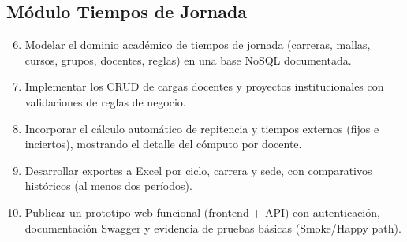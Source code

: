 \subsection*{Módulo Tiempos de Jornada}
\begin{enumerate}\setcounter{enumi}{5}
  \item Modelar el dominio académico de tiempos de jornada (carreras, mallas, cursos, grupos, docentes, reglas) en una base NoSQL documentada.
  \item Implementar los CRUD de cargas docentes y proyectos institucionales con validaciones de reglas de negocio.
  \item Incorporar el cálculo automático de repitencia y tiempos externos (fijos e inciertos), mostrando el detalle del cómputo por docente.
  \item Desarrollar exportes a Excel por ciclo, carrera y sede, con comparativos históricos (al menos dos períodos).
  \item Publicar un prototipo web funcional (frontend + API) con autenticación, documentación Swagger y evidencia de pruebas básicas (Smoke/Happy path).
\end{enumerate}
